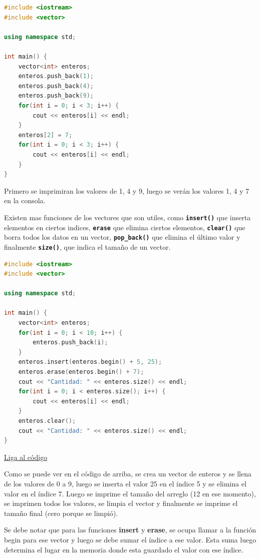\documentclass{article}
\begin{document}
\begin{lstlisting}[language=C++, caption=Modificando valores]
#include <iostream>
#include <vector>

using namespace std;

int main() {
    vector<int> enteros;
    enteros.push_back(1);
    enteros.push_back(4);
    enteros.push_back(9);
    for(int i = 0; i < 3; i++) {
        cout << enteros[i] << endl;
    }
    enteros[2] = 7;
    for(int i = 0; i < 3; i++) {
        cout << enteros[i] << endl;
    }
}
\end{lstlisting}

Primero se imprimiran los valores de 1, 4 y 9, luego se verán los valores 1, 4 y 7 en la consola.

Existen mas funciones de los vectores que son utiles, como \textbf{\lstinline{insert()}} que inserta elementos en ciertos indices, \textbf{\lstinline{erase}} que elimina ciertos elementos, \textbf{\lstinline{clear()}} que borra todos los datos en un vector, \textbf{\lstinline{pop_back()}} que elimina el último valor y finalmente \textbf{\lstinline{size()}}, que indica el tamaño de un vector.

\begin{lstlisting}[language=C++, caption=Jugando con vectores]
#include <iostream>
#include <vector>

using namespace std;

int main() {
    vector<int> enteros;
    for(int i = 0; i < 10; i++) {
        enteros.push_back(i);
    }
    enteros.insert(enteros.begin() + 5, 25);
    enteros.erase(enteros.begin() + 7);
    cout << "Cantidad: " << enteros.size() << endl;
    for(int i = 0; i < enteros.size(); i++) {
        cout << enteros[i] << endl;
    }
    enteros.clear();
    cout << "Cantidad: " << enteros.size() << endl;
}
\end{lstlisting}
\href{https://repl.it/@Jamesscn/Juego-de-Vectores}{Liga al código}

Como se puede ver en el código de arriba, se crea un vector de enteros y se llena de los valores de 0 a 9, luego se inserta el valor 25 en el índice 5 y se elimina el valor en el índice 7. Luego se imprime el tamaño del arreglo (12 en ese momento), se imprimen todos los valores, se limpia el vector y finalmente se imprime el tamaño final (cero porque se limpió).

Se debe notar que para las funciones \textbf{insert} y \textbf{erase}, se ocupa llamar a la función begin para ese vector y luego se debe sumar el índice a ese valor. Esta suma luego determina el lugar en la memoria donde esta guardado el valor con ese índice.
\end{document}
